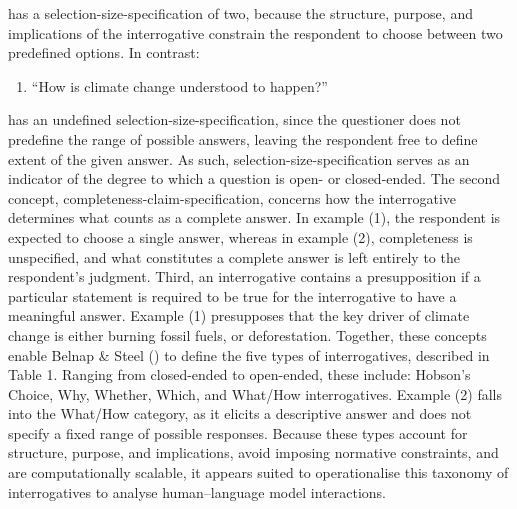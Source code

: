 \documentclass[
  12pt,
]{article}
\providecommand{\tightlist}{%
  \setlength{\itemsep}{0pt}\setlength{\parskip}{0pt}}
\begin{document}
has a selection-size-specification of two, because the structure, purpose, and implications of the interrogative constrain the respondent to choose between two predefined options. In contrast:

\begin{enumerate}
\def\labelenumi{(\arabic{enumi})}
\setcounter{enumi}{1}
\tightlist
\item
  ``How is climate change understood to happen?''
\end{enumerate}

has an undefined selection-size-specification, since the questioner does not predefine the range of possible answers, leaving the respondent free to define extent of the given answer. As such, selection-size-specification serves as an indicator of the degree to which a question is open- or closed-ended. The second concept, completeness-claim-specification, concerns how the interrogative determines what counts as a complete answer. In example (1), the respondent is expected to choose a single answer, whereas in example (2), completeness is unspecified, and what constitutes a complete answer is left entirely to the respondent's judgment. Third, an interrogative contains a presupposition if a particular statement is required to be true for the interrogative to have a meaningful answer. Example (1) presupposes that the key driver of climate change is either burning fossil fuels, or deforestation. Together, these concepts enable Belnap \& Steel () to define the five types of interrogatives, described in Table 1. Ranging from closed-ended to open-ended, these include: Hobson's Choice, Why, Whether, Which, and What/How interrogatives. Example (2) falls into the What/How category, as it elicits a descriptive answer and does not specify a fixed range of possible responses. Because these types account for structure, purpose, and implications, avoid imposing normative constraints, and are computationally scalable, it appears suited to operationalise this taxonomy of interrogatives to analyse human--language model interactions.
\end{document}
